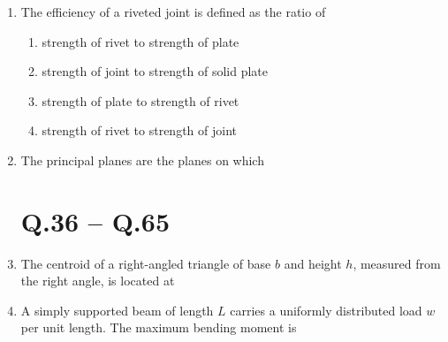 \documentclass[journal,12pt,onecolumn]{IEEEtran}
\theoremstyle{remark}
\begin{document}
\begin{enumerate}
\item The efficiency of a riveted joint is defined as the ratio of\hfill{}

\begin{enumerate}[label=\Alph*.]
\item strength of rivet to strength of plate 
\item strength of joint to strength of solid plate 
\item strength of plate to strength of rivet 
\item strength of rivet to strength of joint
\end{enumerate}

\item The principal planes are the planes on which\hfill{}

\begin{enumerate}[label=\Alph*.]
\end{enumerate}

\section*{Q.36 -- Q.65}

\item The centroid of a right-angled triangle of base $b$ and height $h$, measured from the right angle, is located at\hfill{}

\begin{enumerate}[label=\Alph*.]
\end{enumerate}

\item A simply supported beam of length $L$ carries a uniformly distributed load $w$ per unit length.  
The maximum bending moment is\hfill{}


\end{enumerate}
\end{document}
